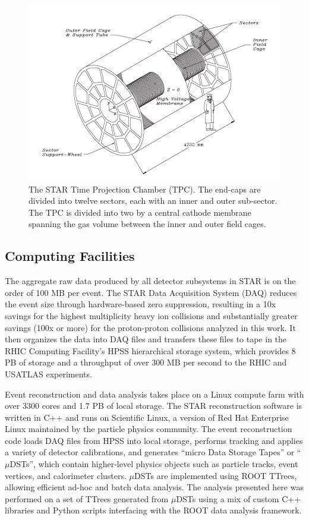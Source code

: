 \begin{figure}
  \includegraphics[width=1.0\textwidth]{figures/tpc}
  \caption{The STAR Time Projection Chamber (TPC).  The end-caps are divided into twelve sectors, each with an inner and outer sub-sector.  The TPC is divided into two by a central cathode membrane spanning the gas volume between the inner and outer field cages.}
  \label{fig:tpc}
\end{figure}

\subsection{Computing Facilities}

The aggregate raw data produced by all detector subsystems in STAR is on the order of 100 MB per event.  The STAR Data Acquisition System (DAQ) \cite{Landgraf:2002zw} reduces the event size through hardware-based zero suppression, resulting in a 10x savings for the highest multiplicity heavy ion collisions and substantially greater savings (100x or more) for the proton-proton collisions analyzed in this work.  It then organizes the data into DAQ files and transfers these files to tape in the RHIC Computing Facility's HPSS hierarchical storage system, which provides 8 PB of storage and a throughput of over 300 MB per second to the RHIC and USATLAS experiments.

Event reconstruction and data analysis takes place on a Linux compute farm with over 3300 cores and 1.7 PB of local storage.  The STAR reconstruction software  is written in C++ and runs on Scientific Linux, a version of Red Hat Enterprise Linux maintained by the particle physics community.  The event reconstruction code loads DAQ files from HPSS into local storage, performs tracking and applies a variety of detector calibrations, and generates ``micro Data Storage Tapes'' or ``$\mu$DSTs'', which contain higher-level physics objects such as particle tracks, event vertices, and calorimeter clusters.  $\mu$DSTs are implemented using ROOT \cite{Brun:1997pa} TTrees, allowing efficient ad-hoc and batch data analysis.  The analysis presented here was performed on a set of TTrees generated from $\mu$DSTs using a mix of custom C++ libraries and Python scripts interfacing with the ROOT data analysis framework.
